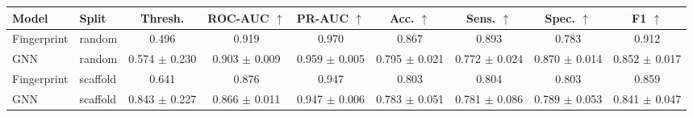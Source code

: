 \begin{tabular}{llccccccc}
\toprule
Model & Split & Thresh. & ROC-AUC $\uparrow$ & PR-AUC $\uparrow$ & Acc. $\uparrow$ & Sens. $\uparrow$ & Spec. $\uparrow$ & F1 $\uparrow$ \\
\midrule
Fingerprint & random & 0.496 & 0.919 & 0.970 & 0.867 & 0.893 & 0.783 & 0.912 \\
GNN & random & 0.574 $\pm$ 0.230 & 0.903 $\pm$ 0.009 & 0.959 $\pm$ 0.005 & 0.795 $\pm$ 0.021 & 0.772 $\pm$ 0.024 & 0.870 $\pm$ 0.014 & 0.852 $\pm$ 0.017 \\
Fingerprint & scaffold & 0.641 & 0.876 & 0.947 & 0.803 & 0.804 & 0.803 & 0.859 \\
GNN & scaffold & 0.843 $\pm$ 0.227 & 0.866 $\pm$ 0.011 & 0.947 $\pm$ 0.006 & 0.783 $\pm$ 0.051 & 0.781 $\pm$ 0.086 & 0.789 $\pm$ 0.053 & 0.841 $\pm$ 0.047 \\
\bottomrule
\end{tabular}
